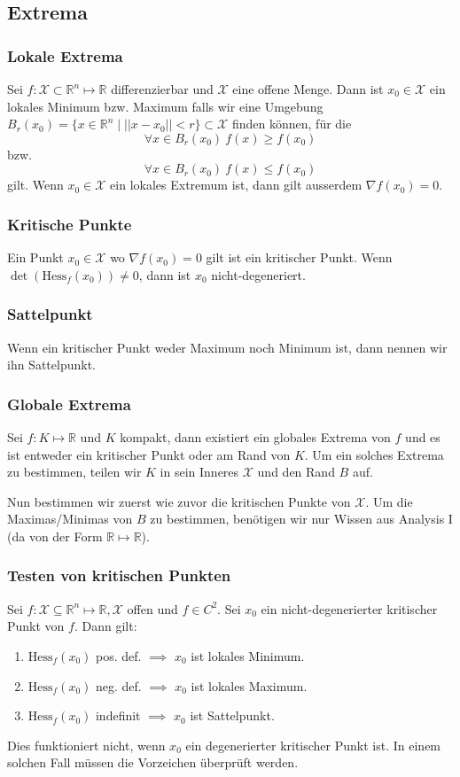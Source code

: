 \documentclass[a4paper,10pt]{article}
\def\R{\mathbb{R}}
\def\X{\mathcal{X}}
\begin{document}
\subsection{Extrema}
\subsubsection*{Lokale Extrema}
Sei \(f: \X \subset \R^n \mapsto \R\) differenzierbar und \(\X\) eine offene Menge. Dann ist \(x_0 \in \X\) ein lokales Minimum bzw. Maximum falls wir eine Umgebung \(B_r(x_0) = \{x\in \R^n \mid ||x-x_0|| < r \} \subset \X\) finden können, für die
\[\forall x \in B_r(x_0)\: f(x) \ge f(x_0)\]
bzw.
\[\forall x \in B_r(x_0)\: f(x) \le f(x_0)\]
gilt. Wenn \(x_0 \in \X\) ein lokales Extremum ist, dann gilt ausserdem \(\nabla f(x_0) = 0\).

\subsubsection*{Kritische Punkte}
Ein Punkt \(x_0 \in \X\) wo \(\nabla f(x_0) = 0\) gilt ist ein kritischer Punkt. Wenn \(\det(\text{Hess}_f(x_0)) \ne 0\), dann ist \(x_0\) nicht-degeneriert.

\subsubsection*{Sattelpunkt}
Wenn ein kritischer Punkt weder Maximum noch Minimum ist, dann nennen wir ihn Sattelpunkt.

\subsubsection*{Globale Extrema}
Sei \(f: K \mapsto \R\) und \(K\) kompakt, dann existiert ein globales Extrema von \(f\) und es ist entweder ein kritischer Punkt oder am Rand von \(K\). Um ein solches Extrema zu bestimmen, teilen wir \(K\) in sein Inneres \(\X\) und den Rand \(B\) auf. 

Nun bestimmen wir zuerst wie zuvor die kritischen Punkte von \(\X\). Um die Maximas/Minimas von \(B\) zu bestimmen, benötigen wir nur Wissen aus Analysis I (da von der Form \(\R \mapsto \R\)).
\subsubsection*{Testen von kritischen Punkten}
Sei \(f: \X \subseteq \R^n \mapsto \R, \X\) offen und \(f\in C^2\). Sei \(x_0\) ein nicht-degenerierter kritischer Punkt von \(f\). Dann gilt:
\begin{enumerate}
  \item $\text{Hess}_f(x_0)$ pos. def. \(\implies\) $x_0$ ist lokales Minimum.
  \item $\text{Hess}_f(x_0)$ neg. def. \(\implies\) $x_0$ ist lokales Maximum.
  \item $\text{Hess}_f(x_0)$ indefinit \(\implies\) $x_0$ ist Sattelpunkt.
\end{enumerate}
Dies funktioniert nicht, wenn \(x_0\) ein degenerierter kritischer Punkt ist. In einem solchen Fall müssen die Vorzeichen überprüft werden.
\end{document}
